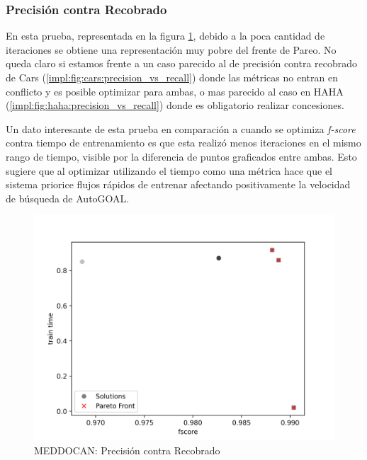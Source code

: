 \subsubsection{Precisi\'on contra Recobrado}
En esta prueba, representada en la figura \ref{impl:fig:MEDDOCAN:precision_vs_recall}, debido a la poca cantidad de iteraciones se obtiene una representaci\'on muy pobre del frente de Pareo. No queda claro si estamos frente a un caso parecido al de precisi\'on contra recobrado de Cars (\ref{impl:fig:cars:precision_vs_recall}) donde las m\'etricas no entran en conflicto y es posible optimizar para ambas, o mas parecido al caso en HAHA (\ref{impl:fig:haha:precision_vs_recall}) donde es obligatorio realizar concesiones.

Un dato interesante de esta prueba en comparaci\'on a cuando se optimiza \textit{f-score} contra tiempo de entrenamiento es que esta realiz\'o menos iteraciones en el mismo rango de tiempo, visible por la diferencia de puntos graficados entre ambas. Esto sugiere que al optimizar utilizando el tiempo como una m\'etrica hace que el sistema priorice flujos r\'apidos de entrenar afectando positivamente la velocidad de b\'usqueda de AutoGOAL.

\begin{figure}[ht]
    \centering
    \includegraphics[scale=0.65]{Pictures/meddocan_precision_vs_recall.jpg}
    \caption{MEDDOCAN: Precisi\'on contra Recobrado}
    \label{impl:fig:MEDDOCAN:precision_vs_recall}
\end{figure}
